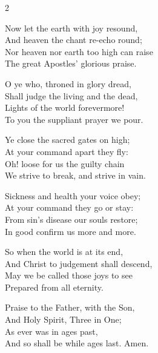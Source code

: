 \begin{multicols}{2}
\begin{enpars}
Now let the earth with joy resound,\\
And heaven the chant re-echo round;\\
Nor heaven nor earth too high can raise\\
The great Apostles' glorious praise.

O ye who, throned in glory dread,\\
Shall judge the living and the dead,\\
Lights of the world forevermore!\\
To you the suppliant prayer we pour.

Ye close the sacred gates on high;\\
At your command apart they fly:\\
Oh! loose for us the guilty chain\\
We strive to break, and strive in vain.

Sickness and health your voice obey;\\
At your command they go or stay:\\
From sin's disease our souls restore;\\
In good confirm us more and more.

So when the world is at its end,\\
And Christ to judgement shall descend,\\
May we be called those joys to see\\
Prepared from all eternity.

Praise to the Father, with the Son,\\
And Holy Spirit, Three in One;\\
As ever was in ages past,\\
And so shall be while ages last. Amen.

\end{enpars}
\end{multicols}